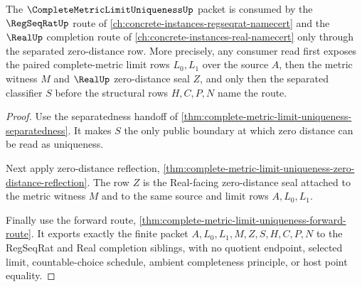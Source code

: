\begin{theorem}
\label{thm:complete-metric-limit-uniqueness-regseqrat-consumer-link}
The $\CompleteMetricLimitUniquenessUp$ packet is consumed by the $\RegSeqRatUp$ route of \autoref{ch:concrete-instances-regseqrat-namecert} and the $\RealUp$ completion route of \autoref{ch:concrete-instances-real-namecert} only through the separated zero-distance row. More precisely, any consumer read first exposes the paired complete-metric limit rows $L_{0},L_{1}$ over the source $A$, then the metric witness $M$ and $\RealUp$ zero-distance seal $Z$, and only then the separated classifier $S$ before the structural rows $H,C,P,N$ name the route.
\end{theorem}
\begin{proof}
Use the separatedness handoff of \autoref{thm:complete-metric-limit-uniqueness-separatedness}. It makes $S$ the only public boundary at which zero distance can be read as uniqueness.

Next apply zero-distance reflection, \autoref{thm:complete-metric-limit-uniqueness-zero-distance-reflection}. The row $Z$ is the Real-facing zero-distance seal attached to the metric witness $M$ and to the same source and limit rows $A,L_{0},L_{1}$.

Finally use the forward route, \autoref{thm:complete-metric-limit-uniqueness-forward-route}. It exports exactly the finite packet $A,L_{0},L_{1},M,Z,S,H,C,P,N$ to the RegSeqRat and Real completion siblings, with no quotient endpoint, selected limit, countable-choice schedule, ambient completeness principle, or host point equality.
\end{proof}


